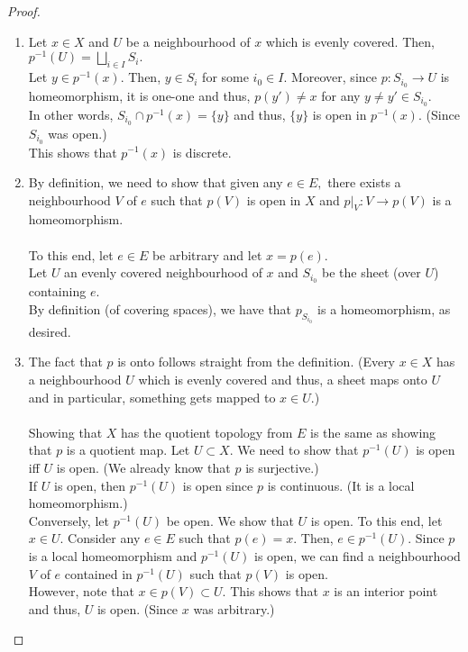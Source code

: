 \documentclass[12pt]{article}
\theoremstyle{definition}
\numberwithin{thm}{section}
\begin{document}
\begin{proof} 
	\phantom{hi}
	\begin{enumerate}
		\item Let $x \in X$ and $U$ be a neighbourhood of $x$ which is evenly covered. Then, $p^{-1}(U) = \displaystyle\bigsqcup_{i \in I} S_i.$\\
		Let $y \in p^{-1}(x).$ Then, $y \in S_i$ for some $i_0 \in I.$ Moreover, since $p:S_{i_0} \to U$ is homeomorphism, it is one-one and thus, $p(y') \neq x$ for any $y \neq y' \in S_{i_0}.$\\
		In other words, $S_{i_0} \cap p^{-1}(x) = \{y\}$ and thus, $\{y\}$ is open in $p^{-1}(x).$ (Since $S_{i_0}$ was open.)\\
		This shows that $p^{-1}(x)$ is discrete.
		\item By definition, we need to show that given any $e \in E,$ there exists a neighbourhood $V$ of $e$ such that $p(V)$ is open in $X$ and $p|_V:V \to p(V)$ is a homeomorphism.\\~\\
		To this end, let $e \in E$ be arbitrary and let $x = p(e).$\\
		Let $U$ an evenly covered neighbourhood of $x$ and $S_{i_0}$ be the sheet (over $U$) containing $e.$\\
		By definition (of covering spaces), we have that $p_{S_{i_0}}$ is a homeomorphism, as desired.
		\item The fact that $p$ is onto follows straight from the definition. (Every $x \in X$ has a neighbourhood $U$ which is evenly covered and thus, a sheet maps onto $U$ and in particular, something gets mapped to $x \in U$.)\\~\\
		Showing that $X$ has the quotient topology from $E$ is the same as showing that $p$ is a quotient map. Let $U \subset X.$ We need to show that $p^{-1}(U)$ is open iff $U$ is open. (We already know that $p$ is surjective.)\\
		If $U$ is open, then $p^{-1}(U)$ is open since $p$ is continuous. (It is a local homeomorphism.)\\
		Conversely, let $p^{-1}(U)$ be open. We show that $U$ is open. To this end, let $x \in U.$ Consider any $e \in E$ such that $p(e) = x.$ Then, $e \in p^{-1}(U).$ Since $p$ is a local homeomorphism and $p^{-1}(U)$ is open, we can find a neighbourhood $V$ of $e$ contained in $p^{-1}(U)$ such that $p(V)$ is open.\\
		However, note that $x \in p(V) \subset U.$ This shows that $x$ is an interior point and thus, $U$ is open. (Since $x$ was arbitrary.)

\end{enumerate}
\end{proof}
\end{document}
